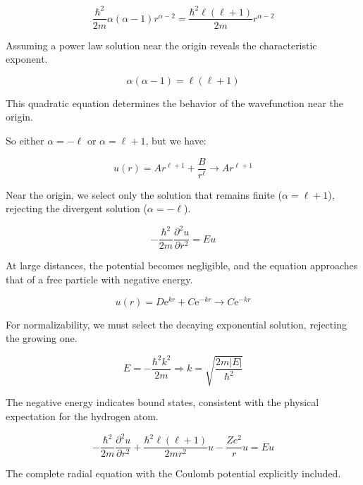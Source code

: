 \documentclass[italian]{HKNdocument}
\begin{document}
\begin{equation}
\frac{\hbar^{2}}{2 m} \alpha(\alpha-1) r^{\alpha-2}=\frac{\hbar^{2} \ell(\ell+1)}{2 m} r^{\alpha-2}
\end{equation}

Assuming a power law solution near the origin reveals the characteristic exponent.

\begin{equation}
\alpha(\alpha-1)=\ell(\ell+1)
\end{equation}

This quadratic equation determines the behavior of the wavefunction near the origin.

So either $\alpha=-\ell$ or $\alpha=\ell+1$, but we have:

\begin{equation}
u(r)=A r^{\ell+1}+\frac{B}{r^{\ell}} \rightarrow A r^{\ell+1}
\end{equation}

Near the origin, we select only the solution that remains finite ($\alpha=\ell+1$), rejecting the divergent solution ($\alpha=-\ell$).

\begin{equation}
-\frac{\hbar^{2}}{2 m} \frac{\partial^{2} u}{\partial r^{2}}=E u
\end{equation}

At large distances, the potential becomes negligible, and the equation approaches that of a free particle with negative energy.

\begin{equation}
u(r)=D \mathrm{e}^{k r}+C \mathrm{e}^{-k r} \rightarrow C \mathrm{e}^{-k r}
\end{equation}

For normalizability, we must select the decaying exponential solution, rejecting the growing one.

\begin{equation}
E=-\frac{\hbar^{2} k^{2}}{2 m} \Longrightarrow k=\sqrt{\frac{2 m|E|}{\hbar^{2}}}
\end{equation}

The negative energy indicates bound states, consistent with the physical expectation for the hydrogen atom.

\begin{equation}
-\frac{\hbar^{2}}{2 m} \frac{\partial^{2} u}{\partial r^{2}}+\frac{\hbar^{2} \ell(\ell+1)}{2 m r^{2}} u-\frac{Z e^{2}}{r} u=E u
\end{equation}

The complete radial equation with the Coulomb potential explicitly included.
\end{document}
